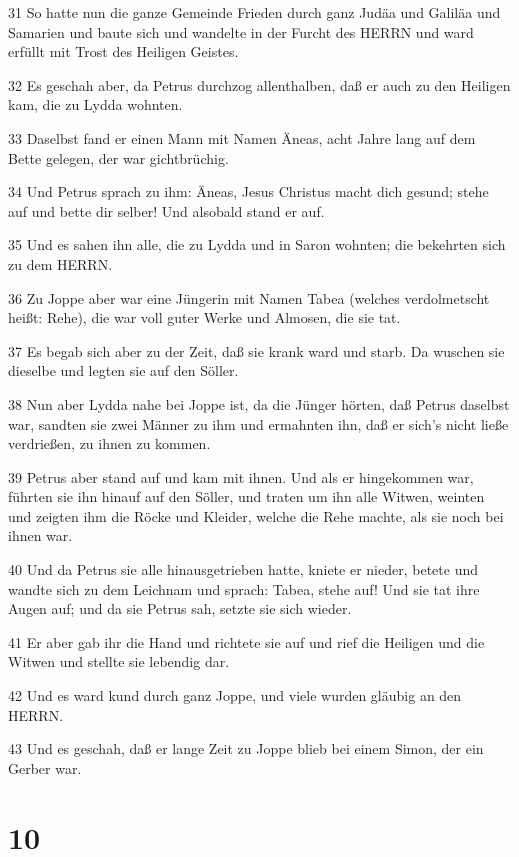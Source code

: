\par 31 So hatte nun die ganze Gemeinde Frieden durch ganz Judäa und Galiläa und Samarien und baute sich und wandelte in der Furcht des HERRN und ward erfüllt mit Trost des Heiligen Geistes.
\par 32 Es geschah aber, da Petrus durchzog allenthalben, daß er auch zu den Heiligen kam, die zu Lydda wohnten.
\par 33 Daselbst fand er einen Mann mit Namen Äneas, acht Jahre lang auf dem Bette gelegen, der war gichtbrüchig.
\par 34 Und Petrus sprach zu ihm: Äneas, Jesus Christus macht dich gesund; stehe auf und bette dir selber! Und alsobald stand er auf.
\par 35 Und es sahen ihn alle, die zu Lydda und in Saron wohnten; die bekehrten sich zu dem HERRN.
\par 36 Zu Joppe aber war eine Jüngerin mit Namen Tabea (welches verdolmetscht heißt: Rehe), die war voll guter Werke und Almosen, die sie tat.
\par 37 Es begab sich aber zu der Zeit, daß sie krank ward und starb. Da wuschen sie dieselbe und legten sie auf den Söller.
\par 38 Nun aber Lydda nahe bei Joppe ist, da die Jünger hörten, daß Petrus daselbst war, sandten sie zwei Männer zu ihm und ermahnten ihn, daß er sich's nicht ließe verdrießen, zu ihnen zu kommen.
\par 39 Petrus aber stand auf und kam mit ihnen. Und als er hingekommen war, führten sie ihn hinauf auf den Söller, und traten um ihn alle Witwen, weinten und zeigten ihm die Röcke und Kleider, welche die Rehe machte, als sie noch bei ihnen war.
\par 40 Und da Petrus sie alle hinausgetrieben hatte, kniete er nieder, betete und wandte sich zu dem Leichnam und sprach: Tabea, stehe auf! Und sie tat ihre Augen auf; und da sie Petrus sah, setzte sie sich wieder.
\par 41 Er aber gab ihr die Hand und richtete sie auf und rief die Heiligen und die Witwen und stellte sie lebendig dar.
\par 42 Und es ward kund durch ganz Joppe, und viele wurden gläubig an den HERRN.
\par 43 Und es geschah, daß er lange Zeit zu Joppe blieb bei einem Simon, der ein Gerber war.

\chapter{10}

